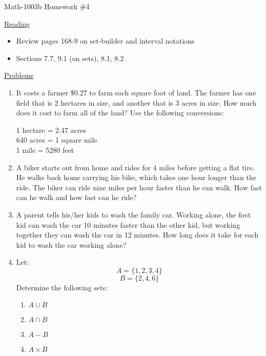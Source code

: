 \documentclass[letterpaper,12pt,fleqn]{article}
\begin{document}
\begin{center}
\Large Math-1003b Homework \#4
\end{center}

\vspace{0.5in}

\underline{Reading}

\bigskip

\begin{itemize}
\item Review pages 168-9 on set-builder and interval notations
\item Sections 7.7, 9.1 (on sets), 8.1, 8.2
\end{itemize}

\bigskip

\underline{Problems}

\bigskip

\begin{enumerate}
\item It costs a farmer \$0.27 to farm each square foot of land. The farmer has
  one field that is 2 hectares in size, and another that is 3 acres in size.
  How much does it cost to farm all of the land? Use the following conversions:

  1 hectare = 2.47 acres \\
  640 acres = 1 square mile \\
  1 mile = 5280 feet

\item A biker starts out from home and rides for 4 miles before getting a
  flat tire. He walks back home carrying his bike, which takes one hour
  longer than the ride. The biker can ride nine miles per hour faster than he
  can walk. How fast can he walk and how fast can he ride?

\item A parent tells his/her kids to wash the family car. Working alone, the
  first kid can wash the car 10 minutes faster than the other kid, but working
  together they can wash the car in 12 minutes. How long does it take for each
  kid to wash the car working alone?

\item Let:
  \[A=\{1,2,3,4\}\]
  \[B=\{2,4,6\}\]
  Determine the following sets:
  \begin{enumerate}
  \item $A\cup B$
  \item $A\cap B$
  \item $A-B$
  \item $A\times B$
  \end{enumerate}
\end{enumerate}
\end{document}
